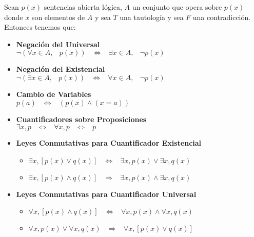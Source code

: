 \documentclass[12pt, fleqn]{report}                             %
\DeclareMathOperator \Space {\quad}                             %
\DeclareMathOperator \MiniSpace {\;}                            %
\newcommand \lequal {\MiniSpace \Leftrightarrow \MiniSpace}     %
\newcommand \linfire {\MiniSpace \Rightarrow \MiniSpace}        %
\begin{document}
                Sean $p(x)$ sentencias abierta lógica, $A$ un conjunto que opera sobre $p(x)$ donde $x$ son
                elementos de $A$ y sea $T$ una tautología y sea $F$ una contradicción.
                Entonces tenemos que:

                \begin{itemize}
                    \item
                    \textbf{Negación del Universal} \\
                    $\lnot (\forall x \in A,\MiniSpace p(x)) \lequal \exists x \in A,\MiniSpace \lnot p(x)$

                    \item
                    \textbf{Negación del Existencial} \\
                    $\lnot (\exists x \in A,\MiniSpace p(x)) \lequal \forall x \in A,\MiniSpace \lnot p(x)$

                    \item \textbf{Cambio de Variables} \\
                            $p(a) \lequal (p(x) \land (x=a))$
                            
                    \item \textbf{Cuantificadores sobre Proposiciones} \\
                            $\exists x, p \lequal \forall x, p \lequal p$

                    \item \textbf{Leyes Conmutativas para Cuantificador Existencial}

                        \begin{itemize}

                            \item
                            $\exists x, [p(x) \lor q(x)] \lequal \exists x, p(x) \lor \exists x, q(x)$

                            \item
                            $\exists x, [p(x) \land q(x)] \linfire \exists x, p(x) \land \exists x, q(x)$

                        \end{itemize}

                    \item \textbf{Leyes Conmutativas para Cuantificador Universal}

                        \begin{itemize}
                            
                            \item
                            $\forall x, [p(x) \land q(x)] \lequal \forall x, p(x) \land \forall x, q(x)$

                            \item
                            $\forall x, p(x) \lor \forall x, q(x) \linfire \forall x, [p(x) \lor q(x)]$

                        \end{itemize}
                        
                \end{itemize}
\end{document}
